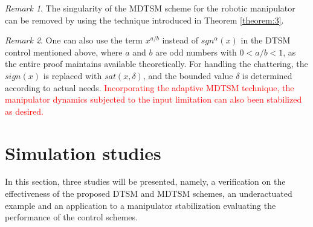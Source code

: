 \documentclass[3p]{elsarticle}
\theoremstyle{plain}
\theoremstyle{remark}
\newtheorem{myrem}{Remark}
\begin{document}
\begin{myrem}
The singularity of the MDTSM scheme for the robotic manipulator can be removed by using the technique introduced in Theorem \ref{theorem:3}.
\end{myrem}
\begin{myrem}
One can also use the term $x^{a/b}$ instead of $sgn^\alpha(x)$ in the DTSM control mentioned above, where $a$ and $b$ are odd numbers with $0<a/b<1$, as the entire proof maintains available theoretically. For handling the chattering, the $sign(x)$ is replaced with $sat(x,\delta)$, and the bounded value $\delta$ is determined according to actual needs. \textcolor{red}{Incorporating the adaptive MDTSM technique, the manipulator dynamics subjected to the input limitation can also been stabilized as desired.}
\end{myrem}
\section{Simulation studies}\label{sec:4}
In this section, three studies will be presented, namely, a verification on the effectiveness of the proposed DTSM and MDTSM schemes, an underactuated example and an application to a manipulator stabilization evaluating the performance of the control schemes.
\end{document}
